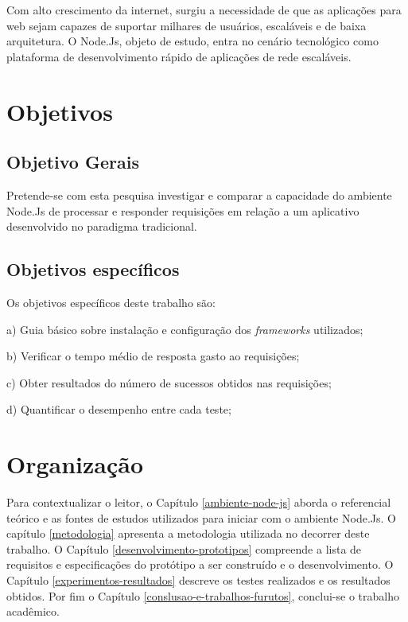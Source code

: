   Com alto crescimento da internet, surgiu a necessidade de que as aplicações para web sejam capazes de suportar milhares de usuários,
  escaláveis e de baixa arquitetura. O Node.Js, objeto de estudo, entra no cenário tecnológico como plataforma de desenvolvimento rápido
  de aplicações de rede escaláveis.
  
\section{Objetivos}
\label{objetivos}


\subsection{Objetivo Gerais}

  Pretende-se com esta pesquisa investigar e comparar a capacidade 
  do ambiente Node.Js de processar e responder requisições em relação a um aplicativo desenvolvido 
  no paradigma tradicional.
 
  
\subsection{Objetivos específicos}

  Os objetivos específicos deste trabalho são:
  
    \begin{compactitem}
      \item[a)] Guia básico sobre instalação e configuração dos \textit{frameworks} utilizados;
      \item[b)] Verificar o tempo médio de resposta gasto ao requisições;
      \item[c)] Obter resultados do número de sucessos obtidos nas requisições;
      \item[d)] Quantificar o desempenho entre cada teste;
    \end{compactitem}
  
  
\section{Organização}
\label{organizacao}  

  Para contextualizar o leitor, o Capítulo \ref{ambiente-node-js} aborda o referencial teórico e as fontes de estudos utilizados para iniciar com o ambiente 
  Node.Js. O capítulo \ref{metodologia} apresenta a metodologia utilizada no decorrer deste trabalho. O Capítulo \ref{desenvolvimento-prototipos} compreende a lista de requisitos e especificações do protótipo a ser construído e o
  desenvolvimento. O Capítulo \ref{experimentos-resultados} descreve os testes realizados e os resultados obtidos. 
  Por fim o Capítulo \ref{conslusao-e-trabalhos-furutos}, conclui-se o trabalho acadêmico.